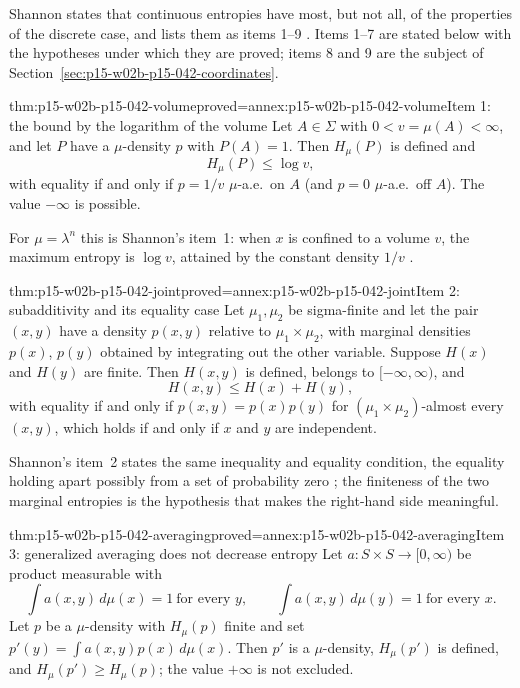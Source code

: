 Shannon states that continuous entropies have most, but not all, of the
properties of the discrete case, and lists them as items 1--9
\cite[sec.~20, pp.~35--38]{Shannon1948MathematicalTheory}. Items 1--7 are stated
below with the hypotheses under which they are proved; items 8 and 9 are the
subject of Section~\ref{sec:p15-w02b-p15-042-coordinates}.

\begin{hbtheorem}{thm:p15-w02b-p15-042-volume}{proved=annex:p15-w02b-p15-042-volume}{Item 1: the bound by the logarithm of the volume}
Let \(A\in\Sigma\) with \(0<v=\mu(A)<\infty\), and let \(P\) have a
\(\mu\)-density \(p\) with \(P(A)=1\). Then \(H_\mu(P)\) is defined and
\[
 H_\mu(P)\leq\log v ,
\]
with equality if and only if \(p=1/v\) \(\mu\)-a.e.\ on \(A\) (and \(p=0\)
\(\mu\)-a.e.\ off \(A\)). The value \(-\infty\) is possible.
\end{hbtheorem}

For \(\mu=\lambda^n\) this is Shannon's item~1: when \(x\) is confined to a
volume \(v\), the maximum entropy is \(\log v\), attained by the constant
density \(1/v\) \cite[sec.~20, p.~35]{Shannon1948MathematicalTheory}.

\begin{hbtheorem}{thm:p15-w02b-p15-042-joint}{proved=annex:p15-w02b-p15-042-joint}{Item 2: subadditivity and its equality case}
Let \(\mu_1,\mu_2\) be sigma-finite and let the pair \((x,y)\) have a density
\(p(x,y)\) relative to \(\mu_1\times\mu_2\), with marginal densities
\(p(x)\), \(p(y)\) obtained by integrating out the other variable.
Suppose \(H(x)\) and \(H(y)\) are finite. Then \(H(x,y)\) is defined, belongs
to \([-\infty,\infty)\), and
\[
 H(x,y)\leq H(x)+H(y),
\]
with equality if and only if \(p(x,y)=p(x)p(y)\) for
\((\mu_1\times\mu_2)\)-almost every \((x,y)\), which holds if and only if
\(x\) and \(y\) are independent.
\end{hbtheorem}

Shannon's item~2 states the same inequality and equality condition, the
equality holding apart possibly from a set of probability zero
\cite[sec.~20, p.~36]{Shannon1948MathematicalTheory}; the finiteness of the two
marginal entropies is the hypothesis that makes the right-hand side
meaningful.

\begin{hbtheorem}{thm:p15-w02b-p15-042-averaging}{proved=annex:p15-w02b-p15-042-averaging}{Item 3: generalized averaging does not decrease entropy}
Let \(a:S\times S\to[0,\infty)\) be product measurable with
\[
 \int a(x,y)\,d\mu(x)=1\ \text{for every }y,\qquad
 \int a(x,y)\,d\mu(y)=1\ \text{for every }x .
\]
Let \(p\) be a \(\mu\)-density with \(H_\mu(p)\) finite and set
\(p'(y)=\int a(x,y)p(x)\,d\mu(x)\). Then \(p'\) is a \(\mu\)-density,
\(H_\mu(p')\) is defined, and \(H_\mu(p')\geq H_\mu(p)\); the value
\(+\infty\) is not excluded.
\end{hbtheorem}

